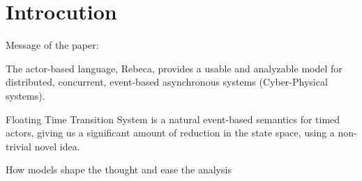 \section{Introcution} \label{sec::introduction}

Message of the paper:

The actor-based language, Rebeca, provides a usable and analyzable model for distributed, concurrent, event-based asynchronous systems (Cyber-Physical systems).
	
Floating Time Transition System is a natural event-based semantics for timed actors, giving us a significant amount of reduction in the state space, using a non-trivial novel idea.
	
How models shape the thought and ease the analysis